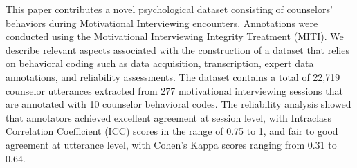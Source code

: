 This paper contributes a novel psychological dataset consisting of counselors' behaviors during Motivational Interviewing encounters. Annotations were conducted using the Motivational Interviewing Integrity Treatment (MITI). We describe relevant aspects associated with the construction of a dataset that relies on behavioral coding such as data acquisition, transcription, expert data annotations, and reliability assessments. The dataset contains a total of 22,719 counselor utterances extracted from 277 motivational interviewing sessions that are annotated with 10 counselor behavioral codes. The reliability analysis showed that annotators achieved excellent agreement at session level, with Intraclass Correlation Coefficient (ICC) scores in the range of 0.75 to 1, and fair to good agreement at utterance level, with Cohen's Kappa scores ranging from 0.31 to 0.64.
